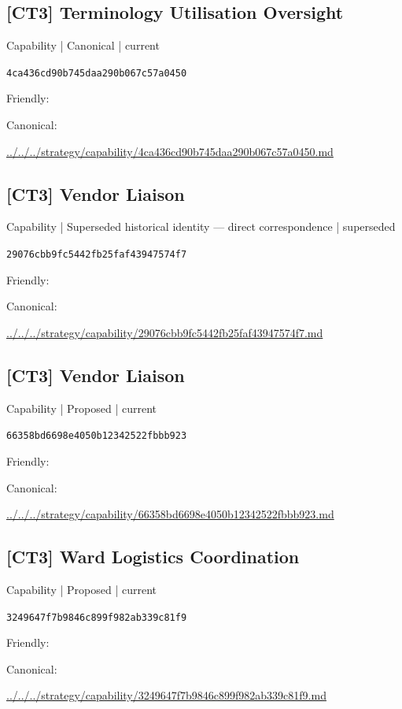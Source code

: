 \documentclass[10pt,a4paper]{article}
\begin{document}
\subsection*{[CT3] Terminology Utilisation Oversight}
{\small Capability | Canonical | current}\par
\texttt{4ca436cd90b745daa290b067c57a0450}\par
Friendly: \par
Canonical: \par
{\footnotesize\url{../../../strategy/capability/4ca436cd90b745daa290b067c57a0450.md}}\par
\subsection*{[CT3] Vendor Liaison}
{\small Capability | Superseded historical identity — direct correspondence | superseded}\par
\texttt{29076cbb9fc5442fb25faf43947574f7}\par
Friendly: \par
Canonical: \par
{\footnotesize\url{../../../strategy/capability/29076cbb9fc5442fb25faf43947574f7.md}}\par
\subsection*{[CT3] Vendor Liaison}
{\small Capability | Proposed | current}\par
\texttt{66358bd6698e4050b12342522fbbb923}\par
Friendly: \par
Canonical: \par
{\footnotesize\url{../../../strategy/capability/66358bd6698e4050b12342522fbbb923.md}}\par
\subsection*{[CT3] Ward Logistics Coordination}
{\small Capability | Proposed | current}\par
\texttt{3249647f7b9846c899f982ab339c81f9}\par
Friendly: \par
Canonical: \par
{\footnotesize\url{../../../strategy/capability/3249647f7b9846c899f982ab339c81f9.md}}\par
\end{document}
